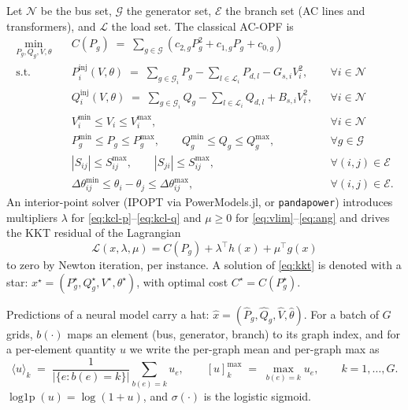 \documentclass[11pt]{article}
\newcommand{\pred}[1]{\widehat{#1}}
\newcommand{\code}[1]{\texttt{\small #1}}
\newcommand{\sig}{\sigma}
\newcommand{\logp}{\operatorname{log1p}}
\DeclareMathOperator*{\amax}{max}
\begin{document}
Let $\mathcal{N}$ be the bus set, $\mathcal{G}$ the generator set, $\mathcal{E}$ the branch
set (AC lines and transformers), and $\mathcal{L}$ the load set. The classical AC-OPF is
\begin{align}
\min_{P_g,Q_g,V,\theta}\quad
& C(P_g) \;=\; \sum_{g\in\mathcal{G}}
\left( c_{2,g} P_{g}^{2} + c_{1,g} P_{g} + c_{0,g}\right)
\label{eq:opf-obj}\\
\text{s.t.}\quad
& P_{i}^{\mathrm{inj}}(V,\theta) \;=\; \textstyle\sum_{g\in\mathcal{G}_i} P_g - \sum_{l\in\mathcal{L}_i} P_{d,l} - G_{s,i}V_i^2,
&& \forall i\in\mathcal{N}
\label{eq:kcl-p}\\
& Q_{i}^{\mathrm{inj}}(V,\theta) \;=\; \textstyle\sum_{g\in\mathcal{G}_i} Q_g - \sum_{l\in\mathcal{L}_i} Q_{d,l} + B_{s,i}V_i^2,
&& \forall i\in\mathcal{N}
\label{eq:kcl-q}\\
& V_i^{\min}\le V_i\le V_i^{\max}, && \forall i\in\mathcal{N}
\label{eq:vlim}\\
& P_g^{\min}\le P_g\le P_g^{\max},\qquad Q_g^{\min}\le Q_g\le Q_g^{\max}, && \forall g\in\mathcal{G}
\label{eq:glim}\\
& |S_{ij}|\le S_{ij}^{\max},\qquad |S_{ji}|\le S_{ij}^{\max}, && \forall (i,j)\in\mathcal{E}
\label{eq:therm}\\
& \Delta\theta_{ij}^{\min}\le \theta_i-\theta_j \le \Delta\theta_{ij}^{\max}, && \forall (i,j)\in\mathcal{E}.
\label{eq:ang}
\end{align}
An interior-point solver (IPOPT via PowerModels.jl, or \code{pandapower}) introduces
multipliers $\lambda$ for \eqref{eq:kcl-p}--\eqref{eq:kcl-q} and $\mu\ge 0$ for
\eqref{eq:vlim}--\eqref{eq:ang} and drives the KKT residual of the Lagrangian
\begin{equation}
\mathcal{L}(x,\lambda,\mu)=C(P_g)+\lambda^\top h(x)+\mu^\top g(x)
\label{eq:kkt}
\end{equation}
to zero by Newton iteration, per instance. A solution of \eqref{eq:kkt} is denoted with a
star: $x^\star=(P_g^\star,Q_g^\star,V^\star,\theta^\star)$, with optimal cost
$C^\star=C(P_g^\star)$.

Predictions of a neural model carry a hat: $\pred{x}=(\pred{P}_g,\pred{Q}_g,\pred{V},\pred\theta)$.
For a batch of $G$ grids, $b(\cdot)$ maps an element (bus, generator, branch) to its graph
index, and for a per-element quantity $u$ we write the per-graph mean and per-graph max as
\begin{equation}
\langle u\rangle_k \;=\; \frac{1}{|\{e: b(e)=k\}|}\sum_{b(e)=k} u_e,
\qquad
[u]^{\amax}_k \;=\; \max_{b(e)=k} u_e ,
\qquad k=1,\dots,G .
\label{eq:pergraph}
\end{equation}
$\logp(u)=\log(1+u)$, and $\sig(\cdot)$ is the logistic sigmoid.
\end{document}
